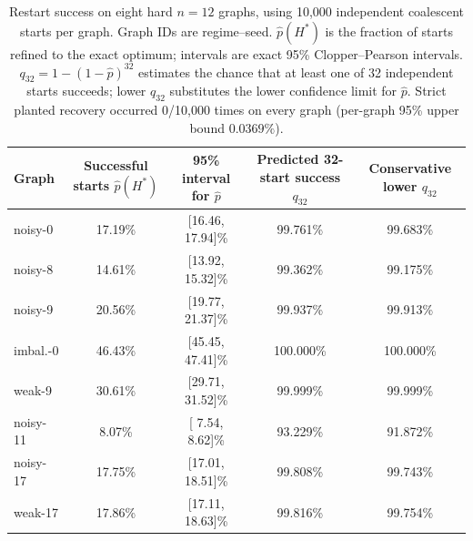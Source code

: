 \begin{table}[H]
\centering
\caption{Restart success on eight hard $n=12$ graphs, using 10,000 independent
coalescent starts per graph. Graph IDs are regime--seed. $\hat p(H^*)$ is the
fraction of starts refined to the exact optimum; intervals are exact 95\%
Clopper--Pearson intervals. $q_{32}=1-(1-\hat p)^{32}$ estimates the chance
that at least one of 32 independent starts succeeds; lower $q_{32}$ substitutes
the lower confidence limit for $\hat p$. Strict planted recovery occurred
0/10,000 times on every graph (per-graph 95\% upper bound $0.0369\%$).}
\label{tab:basin-mc}
\small
\begin{tabular*}{\textwidth}{@{\extracolsep{\fill}}lcccc@{}}
\toprule
Graph
& \shortstack{Successful starts\\$\hat p(H^*)$}
& \shortstack{95\% interval\\for $\hat p$}
& \shortstack{Predicted 32-start\\success $q_{32}$}
& \shortstack{Conservative\\lower $q_{32}$} \\
\midrule
noisy-0  & 17.19\% & [16.46, 17.94]\% & 99.761\% & 99.683\% \\
noisy-8  & 14.61\% & [13.92, 15.32]\% & 99.362\% & 99.175\% \\
noisy-9  & 20.56\% & [19.77, 21.37]\% & 99.937\% & 99.913\% \\
imbal.-0 & 46.43\% & [45.45, 47.41]\% & 100.000\% & 100.000\% \\
weak-9   & 30.61\% & [29.71, 31.52]\% & 99.999\% & 99.999\% \\
noisy-11 &  8.07\% & [ 7.54,  8.62]\% & 93.229\% & 91.872\% \\
noisy-17 & 17.75\% & [17.01, 18.51]\% & 99.808\% & 99.743\% \\
weak-17  & 17.86\% & [17.11, 18.63]\% & 99.816\% & 99.754\% \\
\bottomrule
\end{tabular*}
\end{table}
